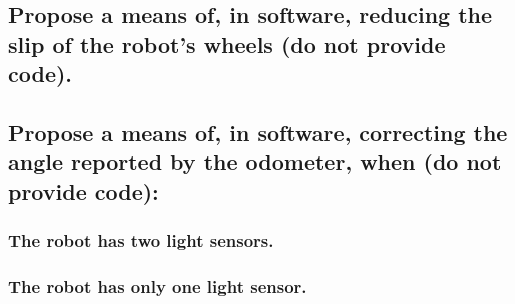 \documentclass[11pt]{article} %
\begin{document}
\subsection{Propose a means of, in software, reducing the slip of the robot's wheels (do not provide code).}
\subsection{Propose a means of, in software, correcting the angle reported by the odometer, when (do not provide code):}
\subsubsection{The robot has two light sensors.}
\subsubsection{The robot has only one light sensor.}
\end{document}
